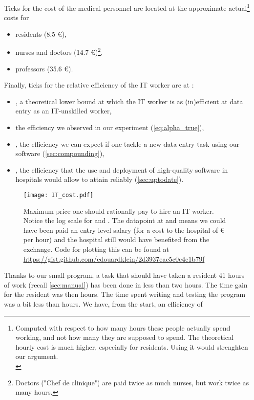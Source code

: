 \documentclass[nobib]{tufte-handout}
\begin{document}
Ticks for the cost of the medical personnel are located at the approximate actual\footnote{Computed with respect to how many hours these people actually spend working, and not how many they are supposed to spend. The theoretical hourly cost is much higher, especially for residents. Using it would strenghten our argument.\\\vspace{1em}} costs for 
\begin{itemize}
\item residents (8.5 €),
\item nurses and doctors (14.7 €)\footnote{Doctors ("Chef de clinique") are paid twice as much nurses, but work twice as many hours.},
\item professors (35.6 €).
\end{itemize}

Finally, ticks for the relative efficiency  of the IT worker are at :
\begin{itemize}
\item , a theoretical lower bound at which the IT worker is as (in)efficient at data entry as an IT-unskilled worker,
\item   the efficiency we observed in our experiment (\autoref{eq:alpha_true}),
\item , the efficiency we can expect if one tackle a new data entry task using our software (\autoref{sec:compounding}),
\item , the efficiency that the use and deployment of high-quality software in hospitals would allow to attain reliably (\autoref{sec:uptodate}).
\end{itemize}

\begin{figure*}
\center
\texttt{[image: IT\_cost.pdf]}
\caption{Maximum price one should rationally pay to hire an IT worker. Notice the log scale for  and . The datapoint at  and  means we could have been paid an entry level salary (for a cost to the hospital of € per hour) and the hospital still would have benefited from the exchange. Code for plotting this can be found at \url{https://gist.github.com/edouardklein/2d3937eac5c0c4c1b79f} }
\label{fig:IT_cost}
\end{figure*}

Thanks to our small program, a task that should have taken a resident 41 hours of work (recall \autoref{sec:manual}) has been done in less than two hours. The time gain for the resident was then  hours. The time spent writing and testing the program was a bit less than  hours. We have, from the start, an efficiency of 
\end{document}
